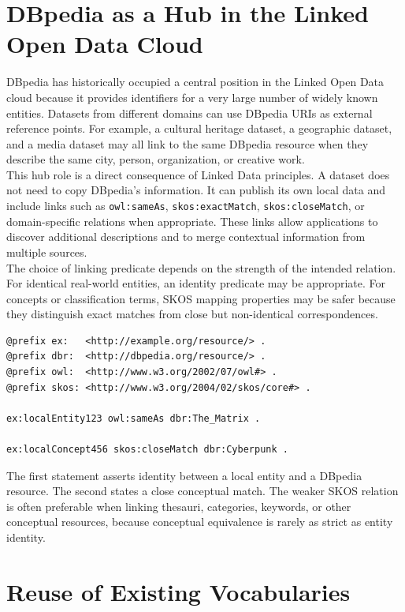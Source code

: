 \documentclass{scrbook}
\begin{document}
	\section{DBpedia as a Hub in the Linked Open Data Cloud}
	
	DBpedia has historically occupied a central position in the Linked Open Data cloud because it provides identifiers for a very large number of widely known entities. Datasets from different domains can use DBpedia URIs as external reference points. For example, a cultural heritage dataset, a geographic dataset, and a media dataset may all link to the same DBpedia resource when they describe the same city, person, organization, or creative work.\\
	
	This hub role is a direct consequence of Linked Data principles. A dataset does not need to copy DBpedia's information. It can publish its own local data and include links such as \texttt{owl:sameAs}, \texttt{skos:exactMatch}, \texttt{skos:closeMatch}, or domain-specific relations when appropriate. These links allow applications to discover additional descriptions and to merge contextual information from multiple sources.\\
	
	The choice of linking predicate depends on the strength of the intended relation. For identical real-world entities, an identity predicate may be appropriate. For concepts or classification terms, SKOS mapping properties may be safer because they distinguish exact matches from close but non-identical correspondences.
	
	\begin{lstlisting}
@prefix ex:   <http://example.org/resource/> .
@prefix dbr:  <http://dbpedia.org/resource/> .
@prefix owl:  <http://www.w3.org/2002/07/owl#> .
@prefix skos: <http://www.w3.org/2004/02/skos/core#> .
	
ex:localEntity123 owl:sameAs dbr:The_Matrix .
	
ex:localConcept456 skos:closeMatch dbr:Cyberpunk .
	\end{lstlisting}
	
	The first statement asserts identity between a local entity and a DBpedia resource. The second states a close conceptual match. The weaker SKOS relation is often preferable when linking thesauri, categories, keywords, or other conceptual resources, because conceptual equivalence is rarely as strict as entity identity.
	
	\section{Reuse of Existing Vocabularies}
	
\end{document}
